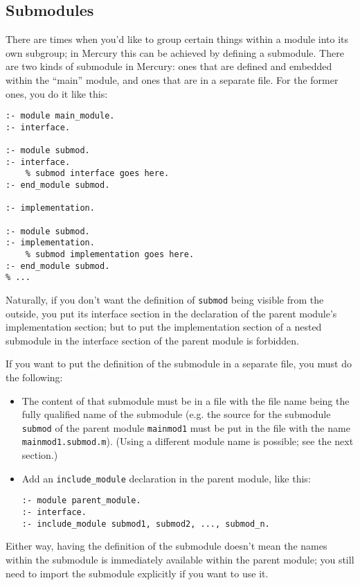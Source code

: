 \subsection{Submodules}

There are times when you'd like to group certain things within a module into its own subgroup; in Mercury this can be achieved by defining a submodule. There are two kinds of submodule in Mercury: ones that are defined and embedded within the ``main'' module, and ones that are in a separate file. For the former ones, you do it like this:

\begin{lstlisting}[language=Mercury]
:- module main_module.
:- interface.

:- module submod.
:- interface.
    % submod interface goes here.
:- end_module submod.

:- implementation.

:- module submod.
:- implementation.
    % submod implementation goes here.
:- end_module submod.
% ...
\end{lstlisting}

Naturally, if you don't want the definition of \texttt{submod} being visible from the outside, you put its interface section in the declaration of the parent module's implementation section; but to put the implementation section of a nested submodule in the interface section of the parent module is forbidden.

If you want to put the definition of the submodule in a separate file, you must do the following:

\begin{itemize}
\item The content of that submodule must be in a file with the file name being the fully qualified name of the submodule (e.g. the source for the submodule \texttt{submod} of the parent module \texttt{mainmod1} must be put in the file with the name \texttt{mainmod1.submod.m}). (Using a different module name is possible; see the next section.)
\item Add an \texttt{include\_module} declaration in the parent module, like this:
\begin{lstlisting}[language=Mercury]
:- module parent_module.
:- interface.
:- include_module submod1, submod2, ..., submod_n.
\end{lstlisting}
\end{itemize}

Either way, having the definition of the submodule doesn't mean the names within the submodule is immediately available within the parent module; you still need to import the submodule explicitly if you want to use it.


